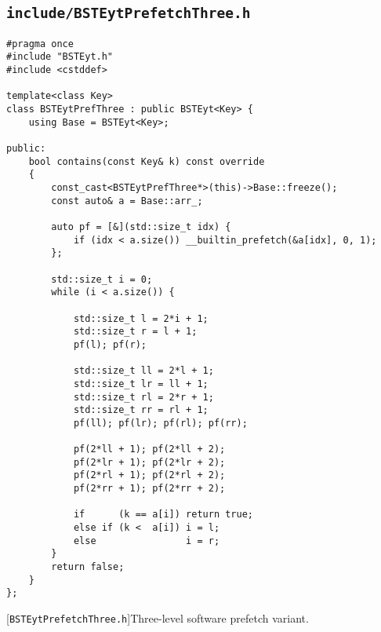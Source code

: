 \subsection{\texttt{include/BSTEytPrefetchThree.h}}
\label{secsec:bsteyt-pref-three-h}
\begin{lstlisting}
#pragma once
#include "BSTEyt.h"
#include <cstddef>

template<class Key>
class BSTEytPrefThree : public BSTEyt<Key> {
    using Base = BSTEyt<Key>;

public:
    bool contains(const Key& k) const override
    {
        const_cast<BSTEytPrefThree*>(this)->Base::freeze();
        const auto& a = Base::arr_;

        auto pf = [&](std::size_t idx) {
            if (idx < a.size()) __builtin_prefetch(&a[idx], 0, 1);
        };

        std::size_t i = 0;
        while (i < a.size()) {

            std::size_t l = 2*i + 1;
            std::size_t r = l + 1;
            pf(l); pf(r);

            std::size_t ll = 2*l + 1;
            std::size_t lr = ll + 1;
            std::size_t rl = 2*r + 1;
            std::size_t rr = rl + 1;
            pf(ll); pf(lr); pf(rl); pf(rr);

            pf(2*ll + 1); pf(2*ll + 2);
            pf(2*lr + 1); pf(2*lr + 2);
            pf(2*rl + 1); pf(2*rl + 2);
            pf(2*rr + 1); pf(2*rr + 2);

            if      (k == a[i]) return true;
            else if (k <  a[i]) i = l;
            else                i = r;
        }
        return false;
    }
};
\end{lstlisting}
[\texttt{BSTEytPrefetchThree.h}]{Three-level software
prefetch variant.}
\label{lst:bsteyt-pref-three-h}


